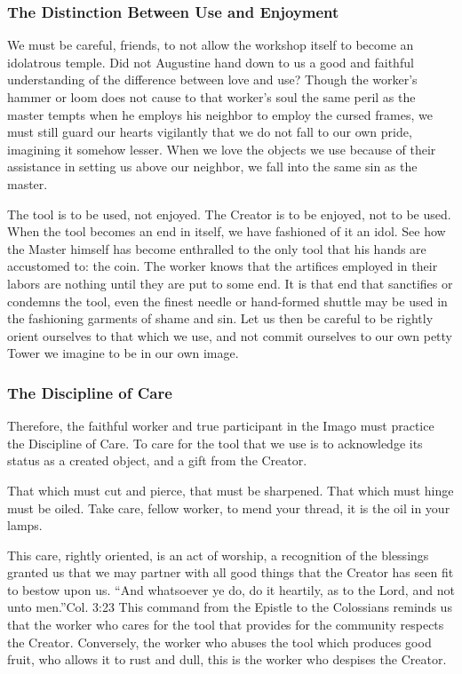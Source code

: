 \subsubsection{The Distinction Between Use and Enjoyment}
\pstart
We must be careful, friends, to not allow the workshop itself to become an idolatrous temple.
Did not Augustine hand down to us a good and faithful understanding of the difference between love and use?
Though the worker's hammer or loom does not cause to that worker's soul the same peril as the master tempts when he employs his neighbor to employ the cursed frames, we must still guard our hearts vigilantly that we do not fall to our own pride, imagining it somehow lesser.
When we love the objects we use because of their assistance in setting us above our neighbor, we fall into the same sin as the master.
\pend

\pstart
The tool is to be used, not enjoyed. The Creator is to be enjoyed, not to be used.
When the tool becomes an end in itself, we have fashioned of it an idol.
See how the Master himself has become enthralled to the only tool that his hands are accustomed to: the coin.
The worker knows that the artifices employed in their labors are nothing until they are put to some end.
It is that end that sanctifies or condemns the tool, even the finest needle or hand-formed shuttle may be used in the fashioning garments of shame and sin.
\pend
\pstart
Let us then be careful to be rightly orient ourselves to that which we use, and not commit ourselves to our own petty Tower we imagine to be in our own image.
\pend

\subsubsection{The Discipline of Care}
\pstart
Therefore, the faithful worker and true participant in the Imago must practice the Discipline of Care.
To care for the tool that we use is to acknowledge its status as a created object, and a gift from the Creator.
\pend

\pstart
That which must cut and pierce, that must be sharpened.
That which must hinge must be oiled.
Take care, fellow worker, to mend your thread, it is the oil in your lamps.
\pend

\pstart
This care, rightly oriented, is an act of worship, a recognition of the blessings granted us that we may partner with all good things that the Creator has seen fit to bestow upon us.
``And whatsoever ye do, do it heartily, as to the Lord, and not unto men.''{Col. 3:23}
This command from the Epistle to the Colossians reminds us that the worker who cares for the tool that provides for the community respects the Creator.
Conversely, the worker who abuses the tool which produces good fruit, who allows it to rust and dull, this is the worker who despises the Creator.
\pend